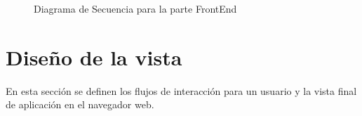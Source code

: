 \begin{figure}[H]
\caption{Diagrama de Secuencia para la parte FrontEnd}
\end{figure}

\section{Diseño de la vista}
En esta sección se definen los flujos de interacción para un usuario y la vista final de aplicación en el navegador web.\\


